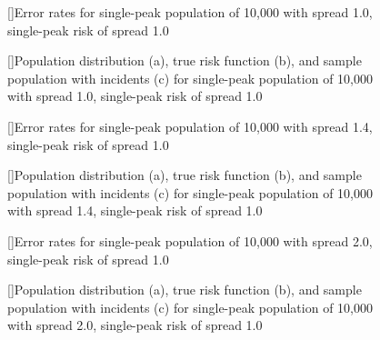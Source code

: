 {%

\begin{figure}[!htb]
    
    []{Error rates for single-peak population of 10,000 with \gls{spread} 1.0, single-peak risk of \gls{spread} 1.0}
    \label{tab:mean_error_rates:p1.0_100_1.0_1h}
    
    []{Population distribution (a), true risk function (b), and sample population with incidents (c) for single-peak population of 10,000 with \gls{spread} 1.0, single-peak risk of \gls{spread} 1.0}
    \label{fig:distributions:p1.0_100_1.0_1h}    
\end{figure}


\begin{figure}[!htb]
    
    []{Error rates for single-peak population of 10,000 with \gls{spread} 1.4, single-peak risk of \gls{spread} 1.0}
    \label{tab:mean_error_rates:p1.4_100_1.0_1h}
    
    []{Population distribution (a), true risk function (b), and sample population with incidents (c) for single-peak population of 10,000 with \gls{spread} 1.4, single-peak risk of \gls{spread} 1.0}
    \label{fig:distributions:p1.4_100_1.0_1h}    
\end{figure}


\begin{figure}[!htb]
    
    []{Error rates for single-peak population of 10,000 with \gls{spread} 2.0, single-peak risk of \gls{spread} 1.0}
    \label{tab:mean_error_rates:p2.0_100_1.0_1h}
    
    []{Population distribution (a), true risk function (b), and sample population with incidents (c) for single-peak population of 10,000 with \gls{spread} 2.0, single-peak risk of \gls{spread} 1.0}
    \label{fig:distributions:p2.0_100_1.0_1h}    
\end{figure}

}
